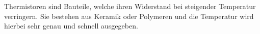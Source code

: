 Thermistoren sind Bauteile, welche ihren Widerstand bei steigender Temperatur verringern. Sie bestehen aus Keramik oder Polymeren und die Temperatur wird hierbei sehr genau und schnell ausgegeben.